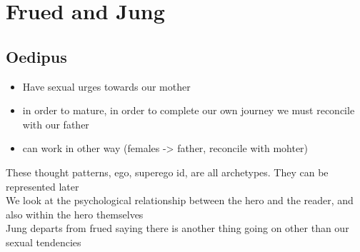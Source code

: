 \documentclass[12pt]{article}
\begin{document}
	\section*{Frued and Jung}
	\subsection*{Oedipus}
	\begin{itemize}
		\item Have sexual urges towards our mother
		\item in order to mature, in order to complete our own journey we must reconcile with our father
		\item can work in other way (females -> father, reconcile with mohter)
	\end{itemize}

	These thought patterns, ego, superego id, are all archetypes. They can be represented later\\
	We look at the psychological relationship between the hero and the reader, and also within the hero themselves\\
	
	Jung departs from frued saying there is another thing going on other than our sexual tendencies\\
	
	
	
	
	
\end{document}
